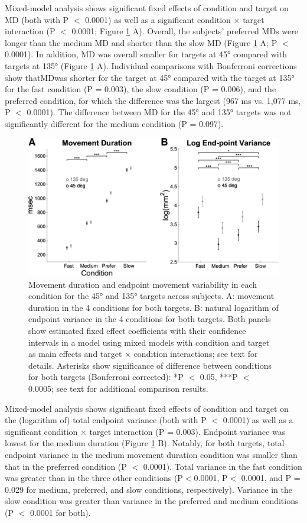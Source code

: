 Mixed-model analysis shows significant fixed effects of condition and target on MD (both with P $<$ 0.0001) as well as a significant condition $\times$ target interaction (P $<$ 0.0001; Figure \ref{fig:mt-data} A). Overall, the subjects’ preferred MDs were longer than the medium MD and shorter than the slow MD (Figure \ref{fig:mt-data} A; P $<$ 0.0001). In addition, MD was overall smaller for targets at \ang{45} compared with targets at \ang{135} (Figure \ref{fig:mt-data} A). Individual comparisons with Bonferroni corrections show thatMDwas shorter for the target at \ang{45} compared with the target at \ang{135} for the fast condition (P = 0.003), the slow condition (P = 0.006), and the preferred condition, for which the difference was the largest (967 ms vs. 1,077 ms, P $<$ 0.0001). The difference between MD for the \ang{45} and \ang{135} targets was not significantly different for the medium condition (P = 0.097). 

\begin{figure}
	\centering
	\includegraphics[width=0.8\linewidth]{figures/MT-data}
	\caption[Movement duration and endpoint movement variability]{Movement duration and endpoint movement variability in each condition for the \ang{45} and \ang{135} targets across subjects. A: movement duration in the 4 conditions for both targets. B: natural logarithm of endpoint variance in the 4 conditions for both targets. Both panels show estimated fixed effect coefficients with their confidence intervals in a model using mixed models with condition and target as main effects and target × condition interactions; see text for details. Asterisks show significance of difference between conditions for both targets (Bonferroni corrected): *P $<$ 0.05, ***P $<$ 0.0005; see text for additional comparison results.}
	\label{fig:mt-data}
\end{figure}


Mixed-model analysis shows significant fixed effects of condition and target on the (logarithm of) total endpoint variance (both with P $<$ 0.0001) as well as a significant condition $\times$ target interaction (P = 0.003). Endpoint variance was lowest for the medium duration (Figure \ref{fig:mt-data} B). Notably, for both targets, total endpoint variance in the medium movement duration condition was smaller than that in the preferred condition (P $<$ 0.0001). Total variance in the fast condition was greater than in the three other conditions (P$<$0.0001, P$<$ 0.0001, and P = 0.029 for medium, preferred, and slow conditions, respectively). Variance in the slow condition was greater than variance in the preferred and medium conditions (P $<$ 0.0001 for both).

